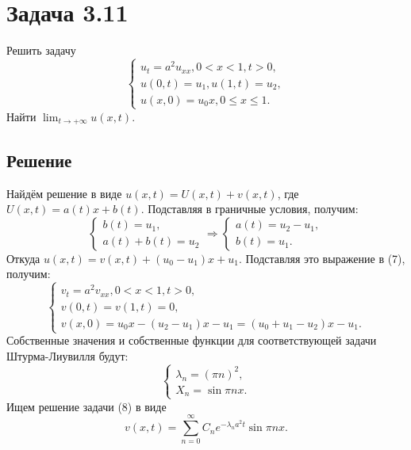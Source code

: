 \documentclass[11pt]{article}
\begin{document}
\section{Задача 3.11}
\label{sec:orgaec3cee}
Решить задачу
\begin{equation}
\begin{cases}
u_t = a^2u_{xx}, 0 < x < 1, t > 0, \\
u(0, t) = u_1, u(1, t) = u_2, \\
u(x, 0) = u_0x, 0 \leq x \leq 1.
\end{cases}
\end{equation}
Найти $\lim_{t \to +\infty}u(x,t)$.
\subsection{Решение}
\label{sec:org3f94063}
Найдём решение в виде \(u(x, t) = U(x, t) + v(x, t)\), где \(U(x, t) = a(t)x + b(t)\).
Подставляя в граничные условия, получим:
   \begin{equation*}
   \begin{cases}
   b(t) = u_1, \\
   a(t) + b(t) = u_2
   \end{cases}
   \Rightarrow
   \begin{cases}
   a(t) = u_2 - u_1, \\
   b(t) = u_1.
   \end{cases}
   \end{equation*}
   Откуда $u(x, t) = v(x, t) + (u_0 - u_1)x + u_1$. Подставляя это выражение в (7), получим:
\begin{equation}
\begin{cases}
v_t = a^2v_{xx}, 0 < x < 1, t > 0, \\
v(0, t) = v(1, t) = 0, \\
v(x, 0) = u_0x - (u_2 - u_1)x - u_1 = (u_0 + u_1 - u_2)x - u_1.
\end{cases}
\end{equation}
Собственные значения и собственные функции для соответствующей задачи Штурма-Лиувилля будут:
\begin{equation*}
\begin{cases}
\lambda_n = \left(\pi n\right)^2, \\
X_n = \sin\pi nx.
\end{cases}
\end{equation*}
Ищем решение задачи (8) в виде
\begin{equation*}
v(x, t) = \sum_{n = 0}^{\infty}C_ne^{-\lambda_na^2t}\sin\pi nx.
\end{equation*}
\end{document}
